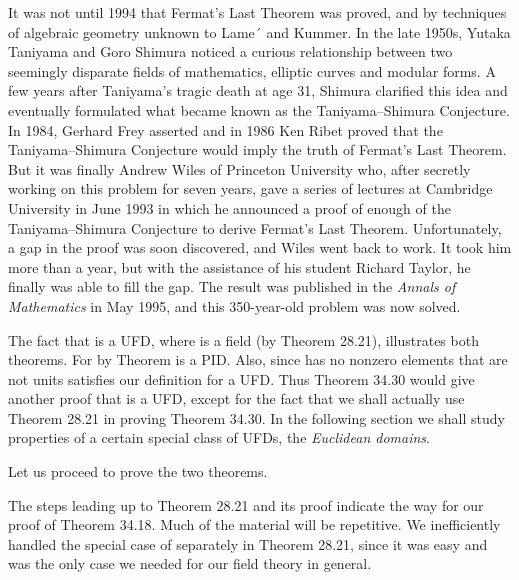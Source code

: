 \documentclass[11pt,oneside]{article}
\begin{document}
\begin{BookBody}
It was not until 1994 that Fermat’s Last Theorem was proved, and by techniques of algebraic geometry unknown to Lame´ and Kummer. In the late 1950s, Yutaka Taniyama and Goro Shimura noticed a curious relationship between two seemingly disparate fields of mathematics, elliptic curves and modular forms. A few years after Taniyama’s tragic death at age 31, Shimura clarified this idea and eventually formulated what became known as the Taniyama–Shimura Conjecture. In 1984, Gerhard Frey asserted and in 1986 Ken Ribet proved that the Taniyama–Shimura Conjecture would imply the truth of Fermat’s Last Theorem. But it was finally Andrew Wiles of Princeton University who, after secretly working on this problem for seven years, gave a series of lectures at Cambridge University in June 1993 in which he announced a proof of enough of the Taniyama–Shimura Conjecture to derive Fermat’s Last Theorem. Unfortunately, a gap in the proof was soon discovered, and Wiles went back to work. It took him more than a year, but with the assistance of his student Richard Taylor, he finally was able to fill the gap. The result was published in the\textit{ Annals of Mathematics} in May 1995, and this 350-year-old problem was now solved.

The fact that  is a UFD, where  is a field (by Theorem 28.21), illustrates both theorems. For by Theorem  is a PID. Also, since  has no nonzero elements that are not units satisfies our definition for a UFD. Thus Theorem 34.30 would give another proof that  is a UFD, except for the fact that we shall actually use Theorem 28.21 in proving Theorem 34.30. In the following section we shall study properties of a certain special class of UFDs, the\textit{ Euclidean domains}.

Let us proceed to prove the two theorems.


\noindent The steps leading up to Theorem 28.21 and its proof indicate the way for our proof of Theorem 34.18. Much of the material will be repetitive. We inefficiently handled the special case of  separately in Theorem 28.21, since it was easy and was the only case we needed for our field theory in general.

\end{BookBody}

\BookNarrativetrue
\end{document}
